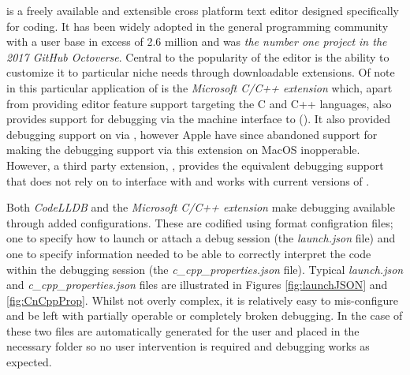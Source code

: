  is a freely available and extensible cross platform text editor designed specifically for coding. It has been widely adopted in the general programming
community with a user base in excess of 2.6 million\citep{VCusers} and was \emph{the number one project in the 2017 GitHub Octoverse}. Central to the 
popularity of the editor is the ability to customize it to particular niche needs through downloadable extensions. Of note in this particular application of  
is the \emph{Microsoft C/C++ extension} \citep{VSCodeCCppExt} which, apart from providing editor feature support targeting the C and C++ languages, also provides support for 
debugging via the machine interface to  (). It also provided debugging support on  via , however Apple have since abandoned support for  making 
the debugging support via this extension on MacOS inopperable. However, a third party extension, \citep{CodeLLDB}, provides the equivalent debugging support that does not rely on
 to interface with  and works with current versions of . 

Both \emph{CodeLLDB} and the \emph{Microsoft C/C++ extension} make debugging available through added configurations. These are codified using \citep{JSON} format configration files;
one to specify how to launch or attach a debug session (the \emph{launch.json} file) and one to specify information needed to be able to correctly interpret the code within the debugging 
session (the \emph{c\_cpp\_properties.json} file). Typical \emph{launch.json} and \emph{c\_cpp\_properties.json} files are illustrated in Figures \ref{fig:launchJSON} and \ref{fig:CnCppProp}.
Whilst not overly complex, it is relatively easy to mis-configure and be left with partially operable or completely broken debugging. In the case of  these two files are 
automatically generated for the user and placed in the necessary folder so no user intervention is required and debugging works as expected.


